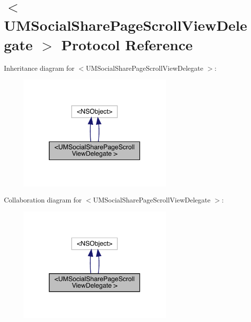 \hypertarget{protocol_u_m_social_share_page_scroll_view_delegate_01-p}{}\section{$<$U\+M\+Social\+Share\+Page\+Scroll\+View\+Delegate $>$ Protocol Reference}
\label{protocol_u_m_social_share_page_scroll_view_delegate_01-p}


Inheritance diagram for $<$U\+M\+Social\+Share\+Page\+Scroll\+View\+Delegate $>$\+:\nopagebreak
\begin{figure}[H]
\begin{center}
\leavevmode
\includegraphics[width=220pt]{protocol_u_m_social_share_page_scroll_view_delegate_01-p__inherit__graph}
\end{center}
\end{figure}


Collaboration diagram for $<$U\+M\+Social\+Share\+Page\+Scroll\+View\+Delegate $>$\+:\nopagebreak
\begin{figure}[H]
\begin{center}
\leavevmode
\includegraphics[width=220pt]{protocol_u_m_social_share_page_scroll_view_delegate_01-p__coll__graph}
\end{center}
\end{figure}
